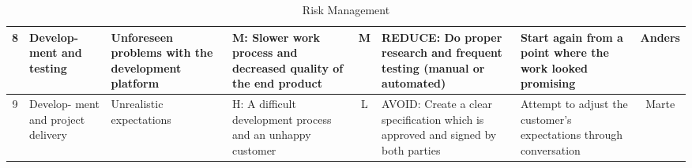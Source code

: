 \begin{landscape}
\begin{table}
\begin{tabular}{| c | p{1.5cm} | p{4cm} | p{4cm} | c | p{4cm} | p{4cm} | c |}
   	8 & Develop- ment and testing & Unforeseen problems with the development platform & 
	M: Slower work process and decreased quality of the end product & M & REDUCE: Do proper research and frequent testing (manual or automated) & Start again from a point where the work looked promising &Anders \\ \hline

   	9 & Develop- ment and project delivery & Unrealistic expectations & H: A difficult development process and an unhappy customer & L & AVOID: Create a clear specification which is approved and signed by both parties & Attempt to adjust the customer’s expectations through conversation & Marte \\
   	\hline
    \end{tabular}
    \caption{Risk Management}
    \label{table:riskmanagement}
    \end{table}
\end{landscape}

\pagestyle{fancy}

